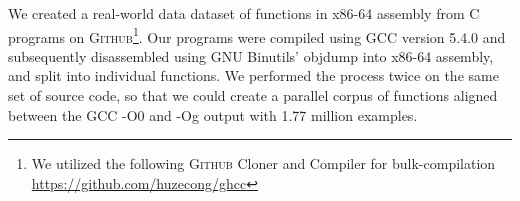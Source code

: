 \documentclass{article}
\newcommand{\GH}{\textsc{Github}}
\begin{document}







We created a real-world data dataset of functions in x86-64 assembly from C programs on \GH \footnote{We utilized the following \GH{}  Cloner and Compiler for bulk-compilation \url{https://github.com/huzecong/ghcc}}. Our programs were compiled using GCC version 5.4.0 and subsequently disassembled using \textsc{GNU} Binutils’ objdump into x86-64 assembly, and split into individual functions. We performed the process twice on the same set of source code, so that we could create a parallel corpus of functions aligned between the GCC -O0 and -Og output with 1.77 million examples. 
\end{document}
